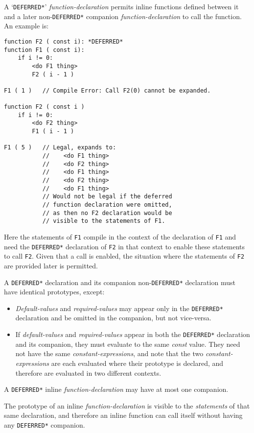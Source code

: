 \documentclass[12pt]{article}
\newenvironment{indpar}[1][0.3in]%
	{\begin{list}{}%
		     {\setlength{\itemsep}{0in}%
		      \setlength{\topsep}{0in}%
		      \setlength{\parsep}{1ex}%
		      \setlength{\labelwidth}{#1}%
		      \setlength{\leftmargin}{#1}%
		      \addtolength{\leftmargin}{\labelsep}}%
	 \item}%
	{\end{list}}
\begin{document}
A `{\tt *DEFERRED*}' {\em function-declaration} permits
inline functions defined between it and a later
non-{\tt *DEFERRED*} companion {\em function-declaration} to call the
function.  An example is:
\begin{indpar}\begin{verbatim}
function F2 ( const i): *DEFERRED*
function F1 ( const i):
    if i != 0:
        <do F1 thing>
        F2 ( i - 1 )

F1 ( 1 )   // Compile Error: Call F2(0) cannot be expanded.

function F2 ( const i )
    if i != 0:
        <do F2 thing>
        F1 ( i - 1 )

F1 ( 5 )   // Legal, expands to:
           //    <do F1 thing>
           //    <do F2 thing>
           //    <do F1 thing>
           //    <do F2 thing>
           //    <do F1 thing>
           // Would not be legal if the deferred
           // function declaration were omitted,
           // as then no F2 declaration would be
           // visible to the statements of F1.
\end{verbatim}\end{indpar}
Here the statements of {\tt F1} compile in the context
of the declaration of {\tt F1} and need the {\tt *DEFERRED*}
declaration of {\tt F2} in that context to enable these
statements to call {\tt F2}.  Given that a call is enabled,
the situation where the statements of {\tt F2} are provided later
is permitted.

A {\tt *DEFERRED*} declaration and its companion non-{\tt *DEFERRED*}
declaration must have identical prototypes, except:
\label{COMPANION-DECLARATION}
\begin{itemize}
\item {\em Default-values} and {\em required-values} may appear
only in the {\tt *DEFERRED*} declaration
and be omitted in the companion, but not vice-versa.
\item If {\em default-values} and {\em required-values} appear
in both the {\tt *DEFERRED*} declaration and its companion,
they must evaluate to the same {\em const} value.  They need not
have the same {\em constant-expressions}, and note
that the two {\em constant-expressions} are each evaluated where
their prototype is declared, and therefore are evaluated in
two different contexts.
\end{itemize}

A {\tt *DEFERRED*} inline {\em function-declaration} may have at
most one companion.

The prototype of an inline {\em function-declaration} is visible
to the {\em statements} of that same declaration, and therefore
an inline function can call itself without having any {\tt *DEFERRED*}
companion.
\end{document}

